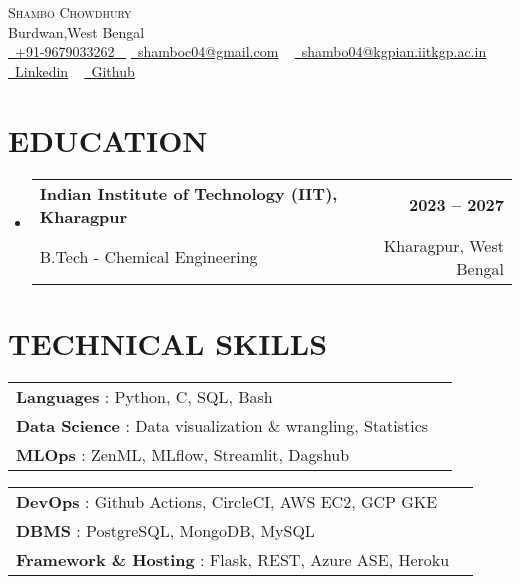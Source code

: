 \documentclass[letterpaper,11pt]{article}
\makeatletter
\newcommand{\resumeSubheading}[4]{
  \vspace{-2pt}\item
    \begin{tabular*}{1.0\textwidth}[t]{l@{\extracolsep{\fill}}r}
      \textbf{\large#1} & \textbf{\small #2} \\
      {\large#3} & {\small #4} \\
      
    \end{tabular*}\vspace{-7pt}
}
\newcommand{\resumeSubHeadingListStart}{\begin{itemize}[leftmargin=0.0in, label={}]}
\newcommand{\resumeSubHeadingListEnd}{\end{itemize}}
\makeatother
\begin{document}
\begin{center}
    {\Huge \scshape Shambo Chowdhury} \\ \vspace{1pt}
    Burdwan,West Bengal \\ \vspace{1pt}
    \small \href{tel:#}{ \raisebox{-0.1\height}\faPhone\ \underline{+91-9679033262} ~} 
    \href{mailto:shamboc04@gmail.com}{\raisebox{-0.2\height}\faEnvelope\  \underline{shamboc04@gmail.com}} ~ 
    \href{mailto:shambo04@kgpian.iitkgp.ac.in}{\raisebox{-0.2\height}\faEnvelope\  \underline{shambo04@kgpian.iitkgp.ac.in}} ~ 
    \href{https://linkedin.com/in/shambo04}{\raisebox{-0.2\height}\faLinkedinSquare\ \underline{Linkedin}}  ~
    \href{https://github.com/typhonshambo}{\raisebox{-0.2\height}\faGithub\ \underline{Github}} ~

\end{center}
 \vspace{0.5mm}


\section{EDUCATION}
  \resumeSubHeadingListStart
    \resumeSubheading
      {Indian Institute of Technology (IIT), Kharagpur}{2023 – 2027}
      {B.Tech - Chemical Engineering}{Kharagpur, West Bengal}
  \resumeSubHeadingListEnd
  

\section{TECHNICAL SKILLS}
\vspace{-5pt}
\begin{center}
\renewcommand{\arraystretch}{1.2}
\begin{minipage}[t]{0.5\textwidth}
\raggedright
\begin{tabularx}{\linewidth}{lX}
\textbf{Languages} : Python, C, SQL, Bash   \\
\textbf{Data Science} : Data visualization \& wrangling, Statistics\\
\textbf{MLOps} : ZenML, MLflow, Streamlit, Dagshub \\


\end{tabularx}
\end{minipage}%
\begin{minipage}[t]{0.5\textwidth}
\raggedright
\begin{tabularx}{\linewidth}{lX}
\textbf{DevOps} : Github Actions, CircleCI, AWS EC2, GCP GKE\\
\textbf{DBMS } : PostgreSQL, MongoDB, MySQL \\
\textbf{Framework \& Hosting} : Flask, REST, Azure ASE, Heroku\\
\end{tabularx}
\end{minipage}
\end{center}
\end{document}
